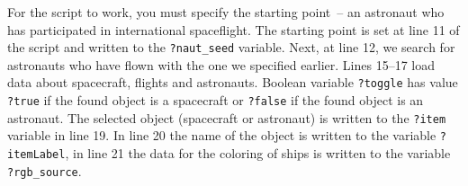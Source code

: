 
For the script to work, you must specify the starting point~-- an astronaut who has participated in international spaceflight. The starting point is set at line 11 of the script and written to the \lstinline{?naut_seed} variable. Next, at line 12, we search for astronauts who have flown with the one we specified earlier. Lines 15--17 load data about spacecraft, flights and astronauts. Boolean variable \lstinline|?toggle| has value \lstinline|?true| if the found object is a spacecraft or \lstinline|?false| if the found object is an astronaut. The selected object (spacecraft or astronaut) is written to the \lstinline|?item| variable in line 19. In line 20 the name of the object is written to the variable \lstinline|?itemLabel|, in line 21 the data for the coloring of ships is written to the variable \lstinline{?rgb_source}. 

